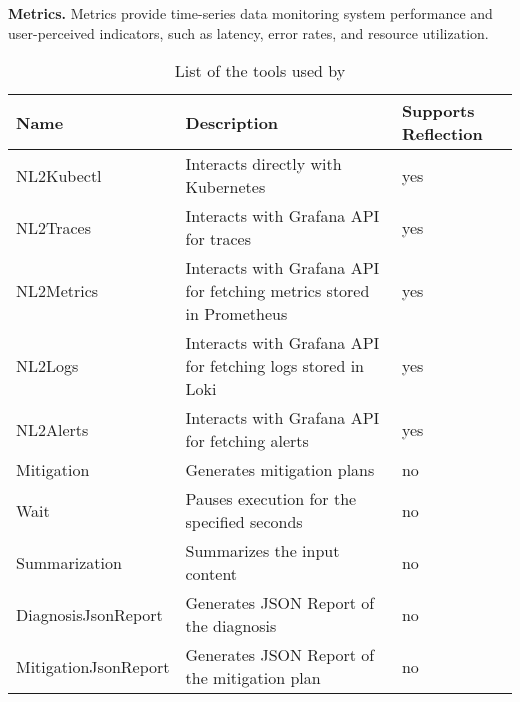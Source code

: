 \textbf{Metrics.} Metrics provide time-series data monitoring system performance and user-perceived indicators, such as latency, error rates, and resource utilization.



\begin{table*}[t!]
   
    \centering
    \begin{threeparttable}
        \caption{\label{tab:tools}List of the tools used by \lumyn}
        \begin{tabular}{m{}m{}m{}}
            \toprule
            \textbf{Name} & \textbf{Description} & \textbf{Supports Reflection}\\
            \midrule
            NL2Kubectl & Interacts directly with Kubernetes & yes \\
            NL2Traces & Interacts with Grafana API for traces & yes \\
            NL2Metrics & Interacts with Grafana API for fetching metrics stored in Prometheus & yes \\
            NL2Logs & Interacts with Grafana API for fetching logs stored in Loki & yes \\
            NL2Alerts & Interacts with Grafana API for fetching alerts & yes \\
            Mitigation & Generates mitigation plans & no \\
            Wait & Pauses execution for the specified seconds & no \\
            Summarization & Summarizes the input content & no \\
            DiagnosisJsonReport & Generates JSON Report of the diagnosis & no \\
            MitigationJsonReport & Generates JSON Report of the mitigation plan & no \\
            \bottomrule
        \end{tabular}
    \end{threeparttable}
\end{table*}


